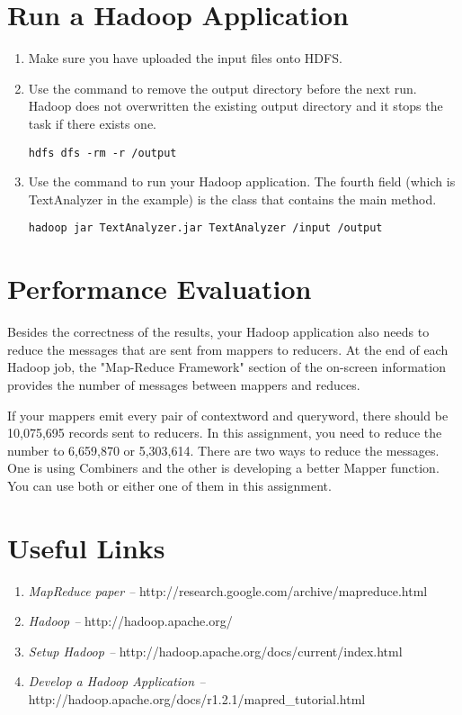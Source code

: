 \documentclass[11pt]{article}
\begin{document}
\section*{Run a Hadoop Application}
\begin{enumerate}
\item Make sure you have uploaded the input files onto HDFS.
\item Use the command to remove the output directory before the next run. Hadoop does not overwritten the existing output directory and it stops the task if there exists one.
\vspace{-.15in}\begin{verbatim}
hdfs dfs -rm -r /output
\end{verbatim}\vspace{-.15in}

\item Use the command to run your Hadoop application. The fourth field (which is TextAnalyzer in the example) is the class that contains the main method.
\vspace{-.15in}\begin{verbatim}
hadoop jar TextAnalyzer.jar TextAnalyzer /input /output
\end{verbatim}\vspace{-.15in}
\end{enumerate}

\noindent 


\section*{Performance Evaluation}
Besides the correctness of the results, your Hadoop application also needs to reduce the messages that are sent from mappers to reducers. At the end of each Hadoop job, the "Map-Reduce Framework" section of the on-screen information provides the number of messages between mappers and reduces.

If your mappers emit every pair of contextword and queryword, there should be 10,075,695 records sent to reducers. In this assignment, you need to reduce the number to 6,659,870 or 5,303,614. There are two ways to reduce the messages. One is using Combiners and the other is developing a better Mapper function. You can use both or either one of them in this assignment.


\section*{Useful Links}
\begin{enumerate}
\item {\em MapReduce paper --} http://research.google.com/archive/mapreduce.html

\item {\em Hadoop --} http://hadoop.apache.org/

\item {\em Setup Hadoop --} http://hadoop.apache.org/docs/current/index.html

\item {\em Develop a Hadoop Application --} http://hadoop.apache.org/docs/r1.2.1/mapred\_tutorial.html
\end{enumerate}
\end{document}
